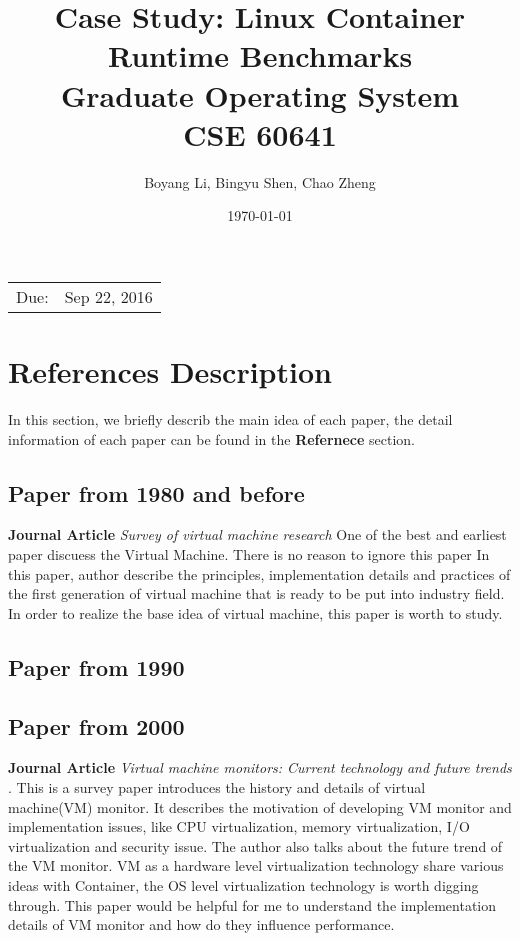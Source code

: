 \documentclass{article}
\title{Case Study: Linux Container Runtime Benchmarks \\ Graduate Operating System \\ CSE 60641} %
\date{\today} %
\author{Boyang Li, Bingyu Shen, Chao Zheng}
\begin{document}
\maketitle %

\begin{center}
\begin{tabular}{l r}
Due: & Sep 22, 2016\\ 
\end{tabular}
\end{center}

\section{References Description}

In this section, we briefly describ the main idea of each paper, the detail information of each
paper can be found in the \textbf{Refernece} section.

\subsection{Paper from 1980 and before}

\textbf{Journal Article} \emph{Survey of virtual machine research}\cite{goldberg1974survey} One
of the best and earliest paper discuess the Virtual Machine. There is no reason to ignore this paper  
In this paper, author describe the principles, implementation details and practices of the first
generation of virtual machine that is ready to be put into industry field. In order to realize the
base idea of virtual machine, this paper is worth to study. 

\subsection{Paper from 1990}

\subsection{Paper from 2000}

\textbf{Journal Article} \emph{Virtual machine monitors: Current technology and future trends}
\cite{rosenblum2005virtual}. This is a survey paper introduces the history and details of virtual 
machine(VM) monitor. It describes the motivation of developing VM monitor and implementation 
issues, like CPU virtualization, memory virtualization, I/O virtualization and security issue. The
author also talks about the future trend of the VM monitor. VM as a hardware level virtualization
technology share various ideas with Container, the OS level virtualization technology is worth 
digging through. This paper would be helpful for me to understand the implementation details of VM 
monitor and how do they influence performance.
\end{document}

